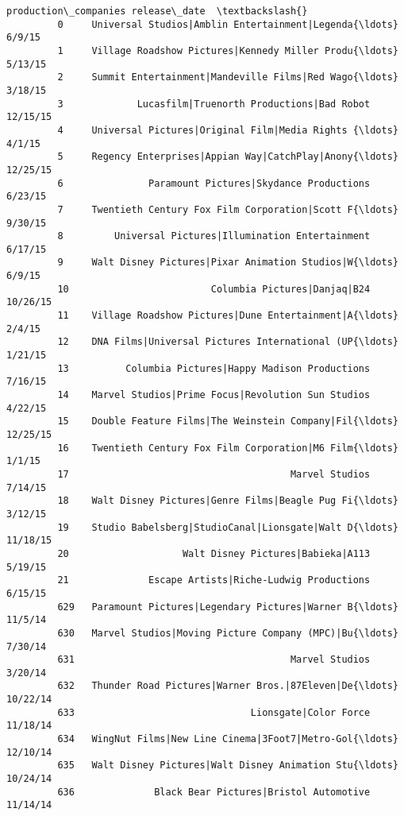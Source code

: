 \documentclass[11pt]{article}
\begin{document}
\begin{Verbatim}[commandchars=\\\{\}]
                                            production\_companies release\_date  \textbackslash{}
         0     Universal Studios|Amblin Entertainment|Legenda{\ldots}       6/9/15   
         1     Village Roadshow Pictures|Kennedy Miller Produ{\ldots}      5/13/15   
         2     Summit Entertainment|Mandeville Films|Red Wago{\ldots}      3/18/15   
         3             Lucasfilm|Truenorth Productions|Bad Robot     12/15/15   
         4     Universal Pictures|Original Film|Media Rights {\ldots}       4/1/15   
         5     Regency Enterprises|Appian Way|CatchPlay|Anony{\ldots}     12/25/15   
         6               Paramount Pictures|Skydance Productions      6/23/15   
         7     Twentieth Century Fox Film Corporation|Scott F{\ldots}      9/30/15   
         8         Universal Pictures|Illumination Entertainment      6/17/15   
         9     Walt Disney Pictures|Pixar Animation Studios|W{\ldots}       6/9/15   
         10                         Columbia Pictures|Danjaq|B24     10/26/15   
         11    Village Roadshow Pictures|Dune Entertainment|A{\ldots}       2/4/15   
         12    DNA Films|Universal Pictures International (UP{\ldots}      1/21/15   
         13          Columbia Pictures|Happy Madison Productions      7/16/15   
         14    Marvel Studios|Prime Focus|Revolution Sun Studios      4/22/15   
         15    Double Feature Films|The Weinstein Company|Fil{\ldots}     12/25/15   
         16    Twentieth Century Fox Film Corporation|M6 Film{\ldots}       1/1/15   
         17                                       Marvel Studios      7/14/15   
         18    Walt Disney Pictures|Genre Films|Beagle Pug Fi{\ldots}      3/12/15   
         19    Studio Babelsberg|StudioCanal|Lionsgate|Walt D{\ldots}     11/18/15   
         20                    Walt Disney Pictures|Babieka|A113      5/19/15   
         21              Escape Artists|Riche-Ludwig Productions      6/15/15   
         629   Paramount Pictures|Legendary Pictures|Warner B{\ldots}      11/5/14   
         630   Marvel Studios|Moving Picture Company (MPC)|Bu{\ldots}      7/30/14   
         631                                      Marvel Studios      3/20/14   
         632   Thunder Road Pictures|Warner Bros.|87Eleven|De{\ldots}     10/22/14   
         633                               Lionsgate|Color Force     11/18/14   
         634   WingNut Films|New Line Cinema|3Foot7|Metro-Gol{\ldots}     12/10/14   
         635   Walt Disney Pictures|Walt Disney Animation Stu{\ldots}     10/24/14   
         636              Black Bear Pictures|Bristol Automotive     11/14/14   

\end{Verbatim}
\end{document}
